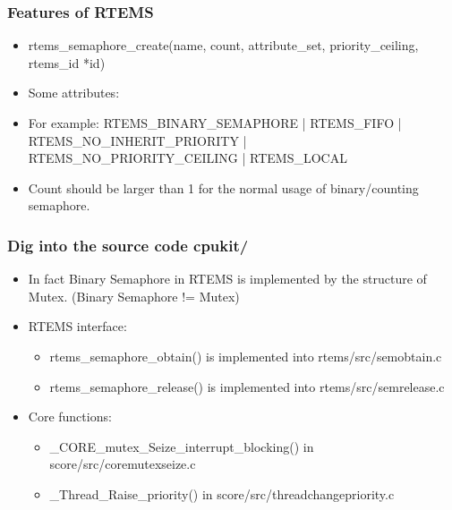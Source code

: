 \documentclass[t]{beamer}
\begin{document}
\begin{frame}
\frametitle{Features of RTEMS}
\begin{itemize}
\item rtems\_semaphore\_create(name, count, attribute\_set, priority\_ceiling, rtems\_id *id)
\item Some attributes:
\item For example:{ \scriptsize{RTEMS\_BINARY\_SEMAPHORE | RTEMS\_FIFO | RTEMS\_NO\_INHERIT\_PRIORITY | RTEMS\_NO\_PRIORITY\_CEILING | RTEMS\_LOCAL}}
\item Count should be larger than 1 for the normal usage of binary/counting semaphore. 
\end{itemize}
\end{frame}

\begin{frame}
\frametitle{Dig into the source code cpukit/}
\begin{itemize}
\item In fact Binary Semaphore in RTEMS is implemented by the structure of Mutex. (Binary Semaphore != Mutex)
\item RTEMS interface:
\begin{itemize}
\item rtems\_semaphore\_obtain() is implemented into rtems/src/semobtain.c
\item rtems\_semaphore\_release() is implemented into rtems/src/semrelease.c
\end{itemize}
\item Core functions:
\begin{itemize}
\item \_CORE\_mutex\_Seize\_interrupt\_blocking() in score/src/coremutexseize.c
\item \_Thread\_Raise\_priority() in score/src/threadchangepriority.c
\end{itemize}

\end{itemize}
\end{frame}
\end{document}
